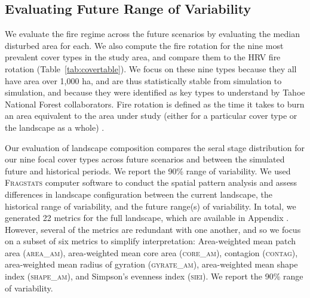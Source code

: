 \documentclass[12pt]{article}
\begin{document}
\begin{spacing}{1}
\subsection*{Evaluating Future Range of Variability}
We evaluate the fire regime across the future scenarios by evaluating the median disturbed area for each. We also compute the fire rotation for the nine most prevalent cover types in the study area, and compare them to the HRV fire rotation (Table~\ref{tab:covertable}). We focus on these nine types because they all have area over 1,000 ha, and are thus statistically stable from simulation to simulation, and because they were identified as key types to understand by Tahoe National Forest collaborators. Fire rotation is defined as the time it takes to burn an area equivalent to the area under study (either for a particular cover type or the landscape as a whole) \citep{Agee1993}.%
%


Our evaluation of landscape composition compares the seral stage distribution for our nine focal cover types across future scenarios and between the simulated future and historical periods. We report the 90\% range of variability.
%
%
We used \textsc{Fragstats} computer software \citep{Fragstats2012} to conduct the spatial pattern analysis and assess differences in landscape configuration between the current landscape, the historical range of variability, and the future range(s) of variability. In total, we generated 22 metrics for the full landscape, which are available in Appendix . However, several of the metrics are redundant with one another, and so we focus on a subset of six metrics to simplify interpretation: Area-weighted mean patch area (\textsc{area\_am}), area-weighted mean core area (\textsc{core\_am}), contagion (\textsc{contag}), area-weighted mean radius of gyration (\textsc{gyrate\_am}), area-weighted mean shape index (\textsc{shape\_am}), and Simpson's evenness index (\textsc{siei}). We report the 90\% range of variability. %


\end{spacing}
\end{document}
